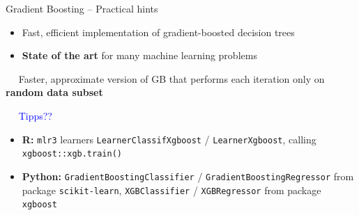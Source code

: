 \begin{frame}{Gradient Boosting -- Practical hints}

\footnotesize


\begin{itemize}
  \item Fast, efficient implementation of gradient-boosted decision trees
  \item \textbf{State of the art} for many machine learning problems
\end{itemize}

\medskip

 ~~ Faster, approximate version of 
GB that performs each iteration only on \textbf{random data subset} 

\medskip

 ~~ \textcolor{blue}{Tipps??}

\medskip


\begin{itemize}
  \item \textbf{R:} \texttt{mlr3} learners \texttt{LearnerClassifXgboost} / 
  \texttt{LearnerXgboost}, calling \texttt{xgboost::xgb.train()}
  \item \textbf{Python:} \texttt{GradientBoostingClassifier} / 
  \texttt{GradientBoostingRegressor} from package \texttt{scikit-learn}, 
  \texttt{XGBClassifier} / \texttt{XGBRegressor} from package \texttt{xgboost}
\end{itemize}

\end{frame}